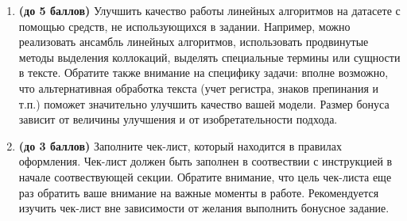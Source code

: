 \documentclass[10pt,fleqn]{article}
\begin{document}
\begin{enumerate}
\textbf{Замечание.} Критерий остановки оптимизации алгоритма связанный с разностью значений функции на соседних эпохах для такого режима обучения неэффективен, необходимо использовать другие критерии, не зависящие от объектов всей выборки, либо производить константное число итераций метода.

\item \textbf{(до 5 баллов)} Улучшить качество работы линейных алгоритмов на датасете с помощью средств, не использующихся в задании. Например, можно реализовать ансамбль линейных алгоритмов, использовать продвинутые методы выделения коллокаций, выделять специальные термины или сущности в тексте. Обратите также внимание на специфику задачи: вполне возможно, что альтернативная обработка текста (учет регистра, знаков препинания и т.п.) поможет значительно улучшить качество вашей модели. Размер бонуса зависит от величины улучшения и от изобретательности подхода.

\item \textbf{(до 3 баллов)} Заполните чек-лист, который находится в правилах оформления. Чек-лист должен быть заполнен в соотвествии с инструкцией в начале соотвествующей секции. Обратите внимание, что цель чек-листа еще раз обратить ваше внимание на важные моменты в работе. Рекомендуется изучить чек-лист вне зависимости от желания выполнить бонусное задание.

\end{enumerate}
\end{document}
